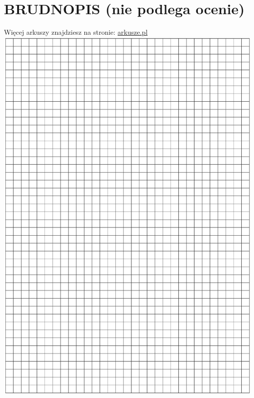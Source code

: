 \documentclass[10pt]{article}
\begin{document}
\section*{BRUDNOPIS (nie podlega ocenie)}
Więcej arkuszy znajdziesz na stronie: \href{http://arkusze.pl}{arkusze.pl}\\
\includegraphics[max width=\textwidth, center]{2024_11_21_a7a52c0c0974ad42b88bg-18}
\end{document}
